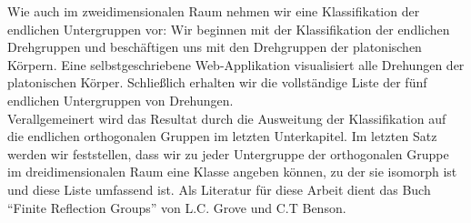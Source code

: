 Wie auch im zweidimensionalen Raum nehmen wir eine Klassifikation der endlichen Untergruppen vor: Wir beginnen mit der Klassifikation der endlichen Drehgruppen und beschäftigen uns mit den Drehgruppen der platonischen Körpern. Eine selbstgeschriebene Web-Applikation visualisiert alle Drehungen der platonischen Körper. Schließlich erhalten wir die vollständige Liste der fünf endlichen Untergruppen von Drehungen.\\
Verallgemeinert wird das Resultat durch die Ausweitung der Klassifikation auf die endlichen orthogonalen Gruppen im letzten Unterkapitel. Im letzten Satz werden wir feststellen, dass wir zu jeder Untergruppe der orthogonalen Gruppe im dreidimensionalen Raum eine Klasse angeben können, zu der sie isomorph ist und diese Liste umfassend ist.
Als Literatur für diese Arbeit dient das Buch \enquote{Finite Reflection Groups} von L.C. Grove und C.T Benson.
